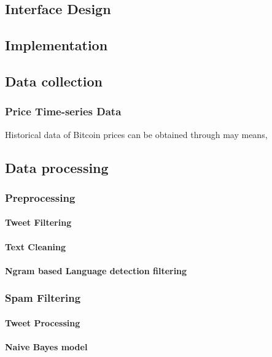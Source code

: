 \documentclass[oneside, 10pt]{article}
\begin{document}
		\subsection{Interface Design}
		
	\newpage 
	\begin{center}
		\section{Implementation}\label{implementation}
	\end{center}

		\subsection{Data collection}\label{collection}
			\subsubsection{Price Time-series Data}
			Historical data of Bitcoin prices can be obtained through may means, 
		
		\subsection{Data processing}\label{processing}
			\subsubsection{Preprocessing}
				\paragraph{Tweet Filtering}
				\paragraph{Text Cleaning}
				\paragraph{Ngram based Language detection filtering}
			
			\subsubsection{Spam Filtering}
				\paragraph{Tweet Processing}
				\paragraph{Naive Bayes model}
		
\end{document}
